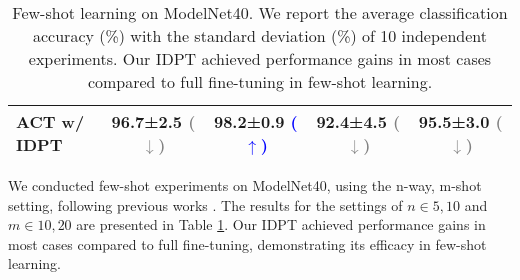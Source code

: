 \documentclass[10pt,twocolumn,letterpaper]{article}
\begin{document}
\begin{table}[htbp]
{\begin{tabular}{lcccc}
    \rowcolor{mycolor}\textbf{ACT w/ IDPT} & 96.7±2.5 \textcolor{gray}{ \textcolor{gray}{($\downarrow$)}} & 98.2±0.9 \textcolor{blue}{ \textcolor{blue}{($\uparrow$)}} & 92.4±4.5 \textcolor{gray}{ \textcolor{gray}{($\downarrow$)}} & 95.5±3.0 \textcolor{gray}{ \textcolor{gray}{($\downarrow$)}} \\
    \bottomrule
    \end{tabular}}
  \caption{Few-shot learning on ModelNet40. We report the average classification accuracy (\%) with the standard deviation (\%) of 10 independent experiments. Our IDPT achieved performance gains in most cases compared to full fine-tuning in few-shot learning.}
  \label{table3}\end{table}

We conducted few-shot experiments on ModelNet40, using the n-way, m-shot setting, following previous works \cite{pang2022masked,yu2022point,zhang2022point}. The results for the settings of $n \in { 5, 10 }$ and $m \in {10, 20}$ are presented in Table \ref{table3}. Our IDPT achieved performance gains in most cases compared to full fine-tuning, demonstrating its efficacy in few-shot learning. 
\end{document}
